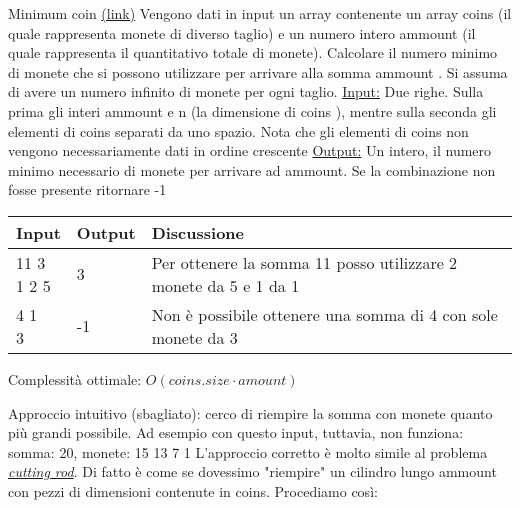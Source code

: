 \begin{esercizio}{Minimum coin \href{https://leetcode.com/problems/coin-change/description/}{(link)}}
	Vengono dati in input un array contenente un array {\ttfamily coins} (il quale rappresenta monete di diverso taglio) e un numero intero {\ttfamily ammount} (il quale rappresenta il quantitativo totale di monete). Calcolare il numero minimo di monete che si possono utilizzare per arrivare alla somma {\ttfamily ammount} . Si assuma di avere un numero infinito di monete per ogni taglio.
	\vskip3mm
	\underline{Input:}
	\vskip3mm Due righe. Sulla prima gli interi {\ttfamily ammount}  e {\ttfamily n}  (la dimensione di {\ttfamily coins} ), mentre sulla seconda gli elementi di {\ttfamily coins}  separati da uno spazio. Nota che gli elementi di {\ttfamily coins} non vengono necessariamente dati in ordine crescente
	\vskip3mm
	\underline{Output:}
	\vskip3mm Un intero, il numero minimo necessario di monete per arrivare ad {\ttfamily ammount}. Se la combinazione non fosse presente ritornare -1
	\vskip3mm
	\renewcommand{\cellalign}{l}
	\begin{tabularx}{\textwidth}{llX}
		\toprule
		Input & Output & Discussione \\
		\midrule
		\makecell{11 3               \\ 1 2 5} & 3 & Per ottenere la somma 11 posso utilizzare 2 monete da 5 e 1 da 1 \\[12pt]
		\makecell{4 1                \\  3} & -1 & Non è possibile ottenere una somma di 4 con sole monete da 3\\
		\bottomrule
	\end{tabularx}
	\vskip3mm
	Complessità ottimale: $ O\left(coins.size \cdot amount\right) $
\end{esercizio}
Approccio intuitivo (sbagliato): cerco di riempire la somma con monete quanto più grandi possibile. Ad esempio con questo input, tuttavia, non funziona: somma: 20, monete: 15 13 7 1
\vskip3mm
L'approccio corretto è molto simile al problema \textit{\hyperref[cuttingrod]{cutting rod}}. Di fatto è come se dovessimo "riempire" un cilindro lungo {\ttfamily ammount} con pezzi di dimensioni contenute in {\ttfamily coins}.
\vskip3mm
Procediamo così:
